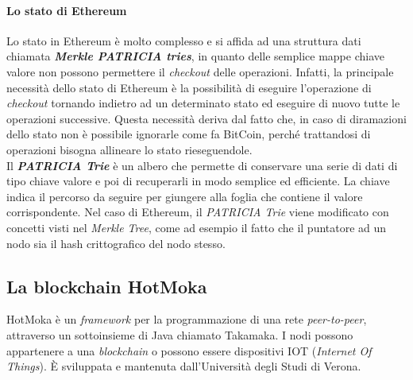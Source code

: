\paragraph{Lo stato di Ethereum}
Lo stato in Ethereum è molto complesso e si affida ad una struttura dati chiamata \textit{\textbf{Merkle PATRICIA tries}}, in quanto delle semplice mappe chiave valore non possono permettere il \textit{checkout} delle operazioni. Infatti, la principale necessità dello stato di Ethereum è la possibilità di eseguire l'operazione di \textit{checkout} tornando indietro ad un determinato stato ed eseguire di nuovo tutte le operazioni successive. Questa necessità deriva dal fatto che, in caso di diramazioni dello stato non è possibile ignorarle come fa BitCoin, perché trattandosi di operazioni bisogna allineare lo stato rieseguendole. \\

Il \textbf{\textit{PATRICIA Trie}} è un albero che permette di conservare una serie di dati di tipo chiave valore e poi di recuperarli in modo semplice ed efficiente. La chiave indica il percorso da seguire per giungere alla foglia che contiene il valore corrispondente. Nel caso di Ethereum, il \textit{PATRICIA Trie} viene modificato con concetti visti nel \textit{Merkle Tree}, come ad esempio il fatto che il puntatore ad un nodo sia il hash crittografico del nodo stesso.


\subsection{La blockchain HotMoka}
HotMoka è un \textit{framework} per la programmazione di una rete \textit{peer-to-peer}, attraverso un sottoinsieme di Java chiamato Takamaka. I nodi possono appartenere a una \textit{blockchain} o possono essere dispositivi IOT (\textit{Internet Of Things}). È sviluppata e mantenuta dall'Università degli Studi di Verona.



